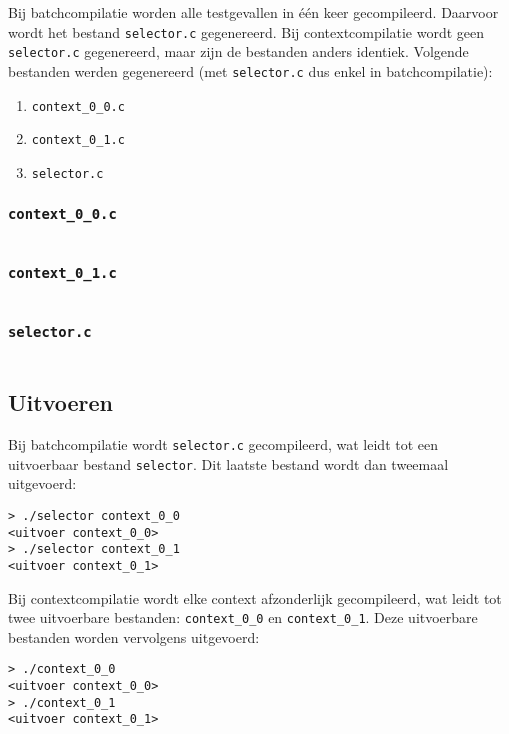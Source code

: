 Bij batchcompilatie worden alle testgevallen in één keer gecompileerd.
Daarvoor wordt het bestand \texttt{selector.c} gegenereerd.
Bij contextcompilatie wordt geen \texttt{selector.c} gegenereerd, maar zijn de bestanden anders identiek.
Volgende bestanden werden gegenereerd (met \texttt{selector.c} dus enkel in batchcompilatie):

\begin{enumerate}
    \item \texttt{context\_0\_0.c}
    \item \texttt{context\_0\_1.c}
    \item \texttt{selector.c}
\end{enumerate}

\subsubsection{\texttt{context\_0\_0.c}}

\inputminted{c}{sources/echo/context_0_0.c}

\subsubsection{\texttt{context\_0\_1.c}}

\inputminted{c}{sources/echo/context_0_1.c}

\subsubsection{\texttt{selector.c}}

\inputminted{c}{sources/echo/selector.c}

\subsection{Uitvoeren}\label{subsec:echo-c-uitvoeren}

Bij batchcompilatie wordt \texttt{selector.c} gecompileerd, wat leidt tot een uitvoerbaar bestand \texttt{selector}.
Dit laatste bestand wordt dan tweemaal uitgevoerd:

\begin{verbatim}
> ./selector context_0_0
<uitvoer context_0_0>
> ./selector context_0_1
<uitvoer context_0_1>    
\end{verbatim}

Bij contextcompilatie wordt elke context afzonderlijk gecompileerd, wat leidt tot twee uitvoerbare bestanden: \texttt{context\_0\_0} en \texttt{context\_0\_1}.
Deze uitvoerbare bestanden worden vervolgens uitgevoerd:

\begin{verbatim}
> ./context_0_0
<uitvoer context_0_0>
> ./context_0_1
<uitvoer context_0_1>
\end{verbatim}
